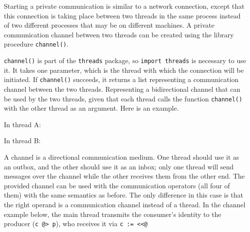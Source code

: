 Starting a private communication is similar to a network connection,
except that this connection is taking place between two threads in the
same process instead of two different processes that may be on
different machines. A private communication channel between two threads
can be created using the library procedure \texttt{channel()}.

\texttt{channel()} is part of the
\texttt{threads} package, so \texttt{import threads} is necessary to use it.
It takes one parameter, which
is the thread with which the connection will be initiated. If
\texttt{channel()} succeeds, it returns a list representing
a communication channel between the two threads. Representing a
bidirectional channel that can be used by the two threads, given that
each thread calls the function \texttt{channel()} with the
other thread as an argument. Here is an example.

In thread A:


In thread B:


A channel is a directional communication medium. 
One thread should use it as an outbox, and the other should use it
as an inbox; only one thread will send messages over the
channel while the other receives them from the other end. The provided
channel can be used with the communication operators (all four of them)
with the same semantics as before. The only difference in this case is
that the right operand is a communication channel instead of a thread.
In the channel example below, the main thread transmits the consumer's
identity to the producer (\texttt{c @{\textgreater} p}), who receives
it via \texttt{c := {\textless}{\textless}@}



